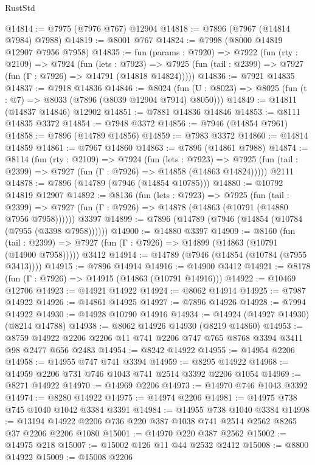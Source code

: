 \begin{lexlean}{RustStd}
\begin{coremodule}
@14814 := @7975 (@7976 @767) @12904
@14818 := @7896 (@7967 (@14814 @7984) @7988)
@14819 := @8001 @767
@14824 := @7998 (@8000 @14819 @12907 @7956 @7958)
@14835 := fun (params : @7920) =>
  @7922
    (fun (rty : @2109) =>
    @7924
      (fun (lets : @7923) =>
      @7925 (fun (tail : @2399) => @7927 (fun (Γ : @7926) => @14791 (@14818 @14824)))))
@14836 := @7921 @14835
@14837 := @7918 @14836
@14846 := @8024
    (fun (U : @8023) => @8025 (fun (t : @7) => @8033 (@7896 (@8039 @12904 @7914) @8050)))
@14849 := @14811 (@14837 @14846) @12902
@14851 := @7881 @14836 @14846
@14853 := @8111 @14835 @3372
@14854 := @7948 @3372
@14856 := @7946 (@14854 @7961)
@14858 := @7896 (@14789 @14856)
@14859 := @7983 @3372
@14860 := @14814 @14859
@14861 := @7967 @14860
@14863 := @7896 (@14861 @7988)
@14874 := @8114
    (fun (rty : @2109) =>
    @7924
      (fun (lets : @7923) =>
      @7925 (fun (tail : @2399) => @7927 (fun (Γ : @7926) => @14858 (@14863 @14824)))))
    @2111
@14878 := @7896 (@14789 (@7946 (@14854 @10785)))
@14880 := @10792 @14819 @12907
@14892 := @8136
    (fun (lets : @7923) =>
    @7925
      (fun (tail : @2399) =>
      @7927 (fun (Γ : @7926) => @14878 (@14863 (@10791 (@14880 @7956 @7958))))))
    @3397
@14899 := @7896 (@14789 (@7946 (@14854 (@10784 (@7955 (@3398 @7958))))))
@14900 := @14880 @3397
@14909 := @8160
    (fun (tail : @2399) => @7927 (fun (Γ : @7926) => @14899 (@14863 (@10791 (@14900 @7958)))))
    @3412
@14914 := @14789 (@7946 (@14854 (@10784 (@7955 @3413))))
@14915 := @7896 @14914
@14916 := @14900 @3412
@14921 := @8178 (fun (Γ : @7926) => @14915 (@14863 (@10791 @14916)))
@14922 := @10469 @12706
@14923 := @14921 @14922
@14924 := @8062 @14914
@14925 := @7987 @14922
@14926 := @14861 @14925
@14927 := @7896 @14926
@14928 := @7994 @14922
@14930 := @14928 @10790 @14916
@14934 := @14924 (@14927 @14930) (@8214 @14788)
@14938 := @8062 @14926 @14930 (@8219 @14860)
@14953 := @8759 @14922 @2206 @2206 @11 @741 @2206 @747 @765 @8768 @3394 @3411 @98 @2477 @656 @2483
@14954 := @8242 @14922
@14955 := @14954 @2206
@14958 := @14955 @747 @741 @3394
@14959 := @8295 @14922
@14968 := @14959 @2206 @731 @746 @1043 @741 @2514 @3392 @2206 @1054
@14969 := @8271 @14922
@14970 := @14969 @2206
@14973 := @14970 @746 @1043 @3392
@14974 := @8280 @14922
@14975 := @14974 @2206
@14981 := @14975 @738 @745 @1040 @1042 @3384 @3391
@14984 := @14955 @738 @1040 @3384
@14998 := @13194 @14922 @2206 @736 @220 @387 @1038 @741 @2514 @2562 @8265 @37 @2206 @2206 @1080
@15001 := @14970 @220 @387 @2562
@15002 := @14975 @218
@15007 := @15002 @126 @11 @44 @2532 @2412
@15008 := @8800 @14922
@15009 := @15008 @2206

\end{coremodule}
\end{lexlean}
